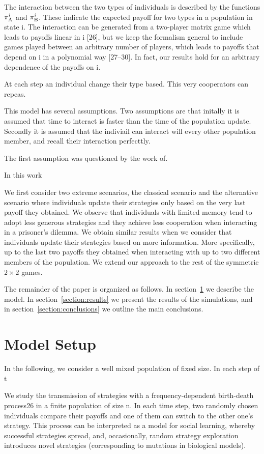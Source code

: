 \documentclass[11pt]{article}
\theoremstyle{plainCl1}
\theoremstyle{plainCl2}
\begin{document}
The interaction between the two types of individuals is described by the
functions $\pi _{{\rm A}}^{i}$ and $\pi _{{\rm B}}^{i}$. These indicate the
expected payoff for two types in a population in state i. The interaction can be
generated from a two-player matrix game which leads to payoffs linear in i [26],
but we keep the formalism general to include games played between an arbitrary
number of players, which leads to payoffs that depend on i in a polynomial way
[27–30]. In fact, our results hold for an arbitrary dependence of the payoffs on
i.

At each step an individual change their type based. This very cooperators
can repeas.

This model has several assumptions. Two assumptions are that initally it is
assumed that time to interact is faster than the time of the population
update. Secondly it is assumed that the indiviail can interact will every
other population member, and recall their interaction perfecttly.

The first assumption was questioned by the work of.

In this work

We first consider two extreme scenarios, the classical scenario and the
alternative scenario where individuals update their strategies only based on the
very last payoff they obtained. We observe that individuals with limited memory
tend to adopt less generous strategies and they achieve less cooperation when
interacting in a prisoner's dilemma. We obtain similar results when we consider
that individuals update their strategies based on more information. More
specifically, up to the last two payoffs they obtained when interacting with up
to two different members of the population. We extend our approach to the rest
of the symmetric \(2 \times 2\) games.

The remainder of the paper is organized as follows. In
section~\ref{section:model} we describe the model. In
section~\ref{section:results} we present the results of the simulations, and in
section~\ref{section:conclusions} we outline the main conclusions.

\section{Model Setup}\label{section:model}

In the following, we consider a well mixed population of fixed size. In each
step of t

We study the transmission of strategies with a frequency-dependent birth-death
process26 in a finite population of size n. In each time step, two randomly
chosen individuals compare their payoffs and one of them can switch to the other
one's strategy. This process can be interpreted as a model for social learning,
whereby successful strategies spread, and, occasionally, random strategy
exploration introduces novel strategies (corresponding to mutations in
biological models).
\end{document}
